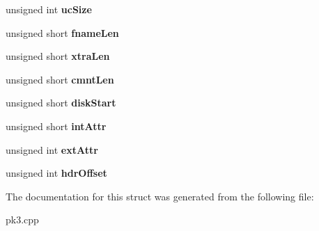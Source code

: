 \begin{DoxyCompactItemize}
\item 
unsigned int {\bfseries uc\+Size}\hypertarget{structCPK3_1_1TZipDirFileHeader_a4e32789e8b7a507bb31bfef1b568302e}{}\label{structCPK3_1_1TZipDirFileHeader_a4e32789e8b7a507bb31bfef1b568302e}

\item 
unsigned short {\bfseries fname\+Len}\hypertarget{structCPK3_1_1TZipDirFileHeader_a5f0fa607389576b59a662fd2bbf3756c}{}\label{structCPK3_1_1TZipDirFileHeader_a5f0fa607389576b59a662fd2bbf3756c}

\item 
unsigned short {\bfseries xtra\+Len}\hypertarget{structCPK3_1_1TZipDirFileHeader_a69c6b66ceb5896bdd739e6d3c7097f3f}{}\label{structCPK3_1_1TZipDirFileHeader_a69c6b66ceb5896bdd739e6d3c7097f3f}

\item 
unsigned short {\bfseries cmnt\+Len}\hypertarget{structCPK3_1_1TZipDirFileHeader_a1caee2d28db8f52ad54989713f71eb4b}{}\label{structCPK3_1_1TZipDirFileHeader_a1caee2d28db8f52ad54989713f71eb4b}

\item 
unsigned short {\bfseries disk\+Start}\hypertarget{structCPK3_1_1TZipDirFileHeader_a1755289e7bc40e8cde7ad4d06b2a4b16}{}\label{structCPK3_1_1TZipDirFileHeader_a1755289e7bc40e8cde7ad4d06b2a4b16}

\item 
unsigned short {\bfseries int\+Attr}\hypertarget{structCPK3_1_1TZipDirFileHeader_a322e59702c5c83569ca4945ea1c00ca4}{}\label{structCPK3_1_1TZipDirFileHeader_a322e59702c5c83569ca4945ea1c00ca4}

\item 
unsigned int {\bfseries ext\+Attr}\hypertarget{structCPK3_1_1TZipDirFileHeader_a5be9dea7236c43c638cd6247c7b8b778}{}\label{structCPK3_1_1TZipDirFileHeader_a5be9dea7236c43c638cd6247c7b8b778}

\item 
unsigned int {\bfseries hdr\+Offset}\hypertarget{structCPK3_1_1TZipDirFileHeader_a5e806d40dc8583f7fae766e67106fd98}{}\label{structCPK3_1_1TZipDirFileHeader_a5e806d40dc8583f7fae766e67106fd98}

\end{DoxyCompactItemize}


The documentation for this struct was generated from the following file\+:\begin{DoxyCompactItemize}
\item 
pk3.\+cpp\end{DoxyCompactItemize}
